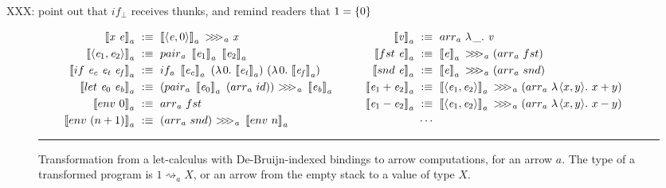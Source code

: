 \documentclass[preprint]{sigplanconf}
\newcommand{\arrow}{\rightsquigarrow}
\newcommand{\arrowarr}{\ensuremath{arr}}
\newcommand{\arrowcomp}{\ensuremath{{>}\mspace{-6mu}{>}\mspace{-6mu}{>}}}
\newcommand{\arrowpair}{\ensuremath{pair}}
\newcommand{\arrowif}{\ensuremath{if}}
\newcommand{\ifbot}{\arrowif_\bot}
\begin{document}
XXX: point out that $\ifbot$ receives thunks, and remind readers that $1 = \{{0}\}$

\newcommand{\gen}{_\mathit{a}}

\begin{figure*}[t]\centering
\begin{align*}
\begin{aligned}[t]
	\meaningof{\mathit{x}~\mathit{e}}\gen &\ :\equiv\
		\meaningof{\pair{\mathit{e},0}}\gen~\arrowcomp\gen~\mathit{x}
\\
	\meaningof{\pair{\mathit{e}_1,\mathit{e}_2}}\gen &\ :\equiv\
		\arrowpair\gen~\meaningof{\mathit{e}_1}\gen~\meaningof{\mathit{e}_2}\gen
\\
	\meaningof{if~\mathit{e_c}~\mathit{e_t}~\mathit{e_f}}\gen &\ :\equiv\
		if\gen~
			\meaningof{\mathit{e_c}}\gen~
			(\fun{0}{\meaningof{\mathit{e_t}}\gen})~
			(\fun{0}{\meaningof{\mathit{e_f}}\gen})
\\
	\meaningof{let~\mathit{e}_0~\mathit{e_b}}\gen &\ :\equiv\ 
		(\arrowpair\gen~\meaningof{\mathit{e}_0}\gen~(\arrowarr\gen~id))~
			\arrowcomp\gen~
		\meaningof{\mathit{e_b}}\gen
\\
	\meaningof{env~0}\gen &\ :\equiv\ \arrowarr\gen~fst
\\
	\meaningof{env~(n+1)}\gen &\ :\equiv\
		(\arrowarr\gen~snd)~\arrowcomp\gen~\meaningof{env~n}\gen
\\
\end{aligned}
&\tab\tab\tab
\begin{aligned}[t]
	\meaningof{\mathit{v}}\gen &\ :\equiv\ \arrowarr\gen~\fun{\_}{\mathit{v}}
\\
	\meaningof{fst~\mathit{e}}\gen &\ :\equiv\
		\meaningof{\mathit{e}}\gen~\arrowcomp\gen~(\arrowarr\gen~fst)
\\
	\meaningof{snd~\mathit{e}}\gen &\ :\equiv\
		\meaningof{\mathit{e}}\gen~\arrowcomp\gen~(\arrowarr\gen~snd)
\\
	\meaningof{\mathit{e}_1 + \mathit{e}_2}\gen &\ :\equiv\
		\meaningof{\pair{\mathit{e}_1,\mathit{e}_2}}\gen~\arrowcomp\gen~(\arrowarr\gen~\fun{\pair{x,y}}{x+y})
\\
	\meaningof{\mathit{e}_1 - \mathit{e}_2}\gen &\ :\equiv\
		\meaningof{\pair{\mathit{e}_1,\mathit{e}_2}}\gen~\arrowcomp\gen~(\arrowarr\gen~\fun{\pair{x,y}}{x-y})
\\
	&\ \cdots\ 
\\
\end{aligned}
\end{align*}
\hrule
\caption{Transformation from a let-calculus with De-Bruijn-indexed bindings to arrow computations, for an arrow $\mathit{a}$.
The type of a transformed program is $1 \arrow\gen X$, or an arrow from the empty stack to a value of type $X$.}
\label{fig:semantic-function}
\end{figure*}
\end{document}
